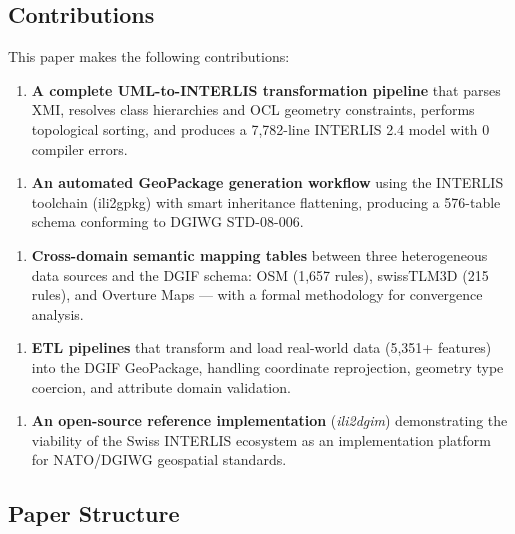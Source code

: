 \documentclass[conference]{IEEEtran}
\begin{document}
\subsection{Contributions}

This paper makes the following contributions:

\begin{enumerate}[leftmargin=*]
\item \textbf{A complete UML-to-INTERLIS transformation pipeline} that parses XMI, resolves class hierarchies and OCL geometry constraints, performs topological sorting, and produces a 7,782-line INTERLIS 2.4 model with 0 compiler errors.
\end{enumerate}

\begin{enumerate}[leftmargin=*]
\item \textbf{An automated GeoPackage generation workflow} using the INTERLIS toolchain (ili2gpkg) with smart inheritance flattening, producing a 576-table schema conforming to DGIWG STD-08-006.
\end{enumerate}

\begin{enumerate}[leftmargin=*]
\item \textbf{Cross-domain semantic mapping tables} between three heterogeneous data sources and the DGIF schema: OSM (1,657 rules), swissTLM3D (215 rules), and Overture Maps — with a formal methodology for convergence analysis.
\end{enumerate}

\begin{enumerate}[leftmargin=*]
\item \textbf{ETL pipelines} that transform and load real-world data (5,351+ features) into the DGIF GeoPackage, handling coordinate reprojection, geometry type coercion, and attribute domain validation.
\end{enumerate}

\begin{enumerate}[leftmargin=*]
\item \textbf{An open-source reference implementation} (\textit{ili2dgim}) demonstrating the viability of the Swiss INTERLIS ecosystem as an implementation platform for NATO/DGIWG geospatial standards.
\end{enumerate}

\subsection{Paper Structure}
\end{document}
